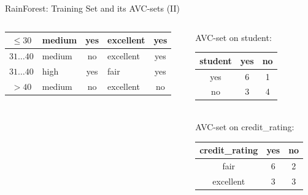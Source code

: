 \documentclass[aspectratio=169,t,table]{beamer}
\begin{document}
{\begin{frame}{RainForest: Training Set and its AVC-sets (II)}
\begin{columns}
\begin{column}{0.6\textwidth}
\begin{tabular}{|c|l|c|l|c|}
            \cellcolor{yellow!20}$\leq30$ & \cellcolor{yellow!20}medium & \cellcolor{yellow!20}yes & \cellcolor{yellow!20}excellent & \cellcolor{green!20}yes \\\hline
            \cellcolor{yellow!20}$31\ldots40$ & \cellcolor{yellow!20}medium & \cellcolor{yellow!20}no & \cellcolor{yellow!20}excellent & \cellcolor{green!20}yes \\\hline
            \cellcolor{yellow!20}$31\ldots40$ & \cellcolor{yellow!20}high & \cellcolor{yellow!20}yes & \cellcolor{yellow!20}fair & \cellcolor{green!20}yes \\\hline
            \cellcolor{yellow!20}$>40$ & \cellcolor{yellow!20}medium & \cellcolor{yellow!20}no & \cellcolor{yellow!20}excellent & \cellcolor{red!20}no \\\hline
          \end{tabular}
        \end{column}
        \begin{column}{0.3\textwidth}
          \vspace{-3cm}

          \centering
          AVC-set on student:\\
          \begin{tabular}{|c|c|c|}
            \hline
            student & yes & no \\\hline
            yes & 6 & 1 \\\hline
            no & 3 & 4 \\\hline
          \end{tabular}\\[1cm]
          AVC-set on credit\_rating:\\
          \begin{tabular}{|c|c|c|}
            \hline
            credit\_rating & yes & no \\\hline
            fair & 6 & 2 \\\hline
            excellent & 3 & 3 \\\hline
          \end{tabular}
        \end{column}
      \end{columns}
    \end{frame}
  }
\end{document}
